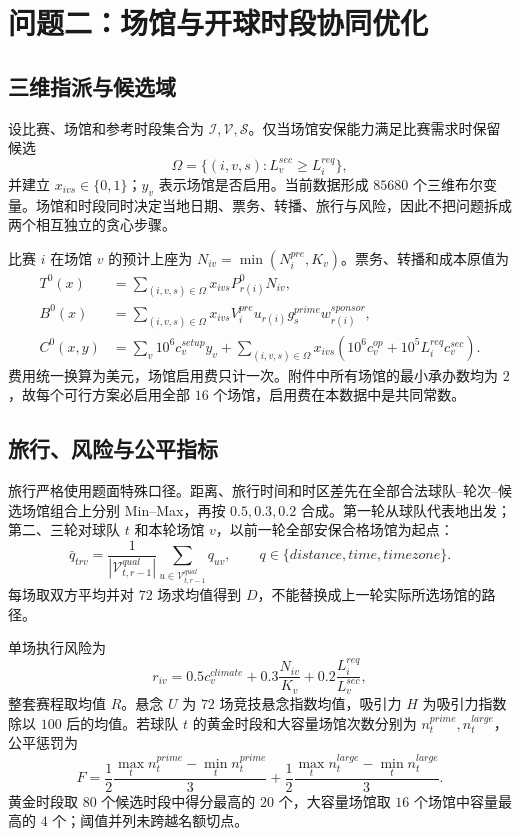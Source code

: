 \section{问题二：场馆与开球时段协同优化}

\subsection{三维指派与候选域}

设比赛、场馆和参考时段集合为 $\mathcal I,\mathcal V,\mathcal S$。仅当场馆安保能力满足比赛需求时保留候选
\begin{equation}
\Omega=\{(i,v,s):L_v^{sec}\ge L_i^{req}\},
\end{equation}
并建立 $x_{ivs}\in\{0,1\}$；$y_v$ 表示场馆是否启用。当前数据形成 $85680$ 个三维布尔变量。场馆和时段同时决定当地日期、票务、转播、旅行与风险，因此不把问题拆成两个相互独立的贪心步骤。

比赛 $i$ 在场馆 $v$ 的预计上座为 $N_{iv}=\min(N_i^{pre},K_v)$。票务、转播和成本原值为
\begin{align}
T^0(x)&=\sum_{(i,v,s)\in\Omega}x_{ivs}P_{r(i)}^0N_{iv},\\
B^0(x)&=\sum_{(i,v,s)\in\Omega}x_{ivs}V_i^{pre}u_{r(i)}g_s^{prime}w_{r(i)}^{sponsor},\\
C^0(x,y)&=\sum_v10^6c_v^{setup}y_v+
\sum_{(i,v,s)\in\Omega}x_{ivs}\left(10^6c_v^{op}+10^5L_i^{req}c_v^{sec}\right).
\end{align}
费用统一换算为美元，场馆启用费只计一次。附件中所有场馆的最小承办数均为 $2$，故每个可行方案必启用全部 $16$ 个场馆，启用费在本数据中是共同常数。

\subsection{旅行、风险与公平指标}

旅行严格使用题面特殊口径。距离、旅行时间和时区差先在全部合法球队--轮次--候选场馆组合上分别 Min--Max，再按 $0.5,0.3,0.2$ 合成。第一轮从球队代表地出发；第二、三轮对球队 $t$ 和本轮场馆 $v$，以前一轮全部安保合格场馆为起点：
\begin{equation}
\bar q_{trv}=\frac{1}{|\mathcal V_{t,r-1}^{qual}|}
\sum_{u\in\mathcal V_{t,r-1}^{qual}}q_{uv},\qquad
q\in\{distance,time,timezone\}.
\end{equation}
每场取双方平均并对 $72$ 场求均值得到 $D$，不能替换成上一轮实际所选场馆的路径。

单场执行风险为
\begin{equation}
r_{iv}=0.5c_v^{climate}+0.3\frac{N_{iv}}{K_v}+0.2\frac{L_i^{req}}{L_v^{sec}},
\end{equation}
整套赛程取均值 $R$。悬念 $U$ 为 $72$ 场竞技悬念指数均值，吸引力 $H$ 为吸引力指数除以 $100$ 后的均值。若球队 $t$ 的黄金时段和大容量场馆次数分别为 $n_t^{prime},n_t^{large}$，公平惩罚为
\begin{equation}
F=\frac12\frac{\max_t n_t^{prime}-\min_t n_t^{prime}}3+
\frac12\frac{\max_t n_t^{large}-\min_t n_t^{large}}3.
\end{equation}
黄金时段取 $80$ 个候选时段中得分最高的 $20$ 个，大容量场馆取 $16$ 个场馆中容量最高的 $4$ 个；阈值并列未跨越名额切点。

